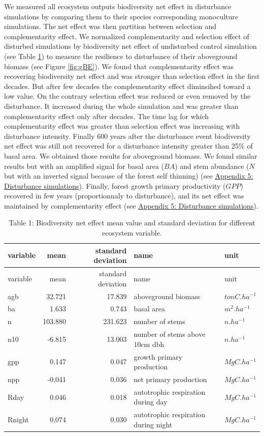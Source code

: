 \documentclass[12pt,]{article}
\theoremstyle{definition}
\theoremstyle{definition}
\theoremstyle{remark}
\begin{document}
We measured all ecosystem outputs biodiversity net effect in disturbance
simulations by comparing them to their species corresponding monoculture
simulations. The net effect was then partition between selection and
complementarity effect. We normalized complementarity and selection
effect of disturbed simulations by biodiversity net effect of
undisturbed control simulation (see Table \ref{tab:tNE}) to measure the
resilience to disturbance of their aboveground biomass (see Figure
\ref{fig:gBE}). We found that complementarity effect was recovering
biodiversity net effect and was stronger than selection effect in the
first decades. But after few decades the complementarity effect
diminsihed toward a low value. On the contrary selection effect was
reduced or even removed by the disturbance. It increased during the
whole simulation and was greater than complementarity effect only after
decades. The time lag for which complementarity effect was greater than
selection effect was increasing with disturbance intensity. Finally 600
years after the disturbance event biodiversity net effect was still not
recovered for a disturbance intensity greater than 25\% of basal area.
We obtained those results for aboveground biomass. We found similar
results but with an amplified signal for basal area (\(BA\)) and stem
abundance (\(N\) but with an inverted signal because of the forest self
thinning) (see
\protect\hyperlink{appendix-5-disturbance-simulations}{Appendix 5:
Disturbance simulations}). Finally, forest growth primary productivity
(\(GPP\)) recovered in few years (proportionnaly to disturbance), and
its net effect was maintained by complementarity effect (see
\protect\hyperlink{appendix-5-disturbance-simulations}{Appendix 5:
Disturbance simulations}).

\begin{longtable}[]{@{}lrrll@{}}
\caption{\label{tab:tNE}Table 1: Biodiversity net effect mean value and
standard deviation for different ecosystem variable.}\tabularnewline
\toprule
variable & mean & standard deviation & name & unit\tabularnewline
\midrule
\endfirsthead
\toprule
variable & mean & standard deviation & name & unit\tabularnewline
\midrule
\endhead
agb & 32.721 & 17.839 & aboveground biomass &
\(tonC.ha^{-1}\)\tabularnewline
ba & 1.633 & 0.743 & basal area & \(m^2.ha^{-1}\)\tabularnewline
n & 103.880 & 231.623 & number of stems & \(n.ha^{-1}\)\tabularnewline
n10 & -6.815 & 13.003 & number of stems above 10cm dbh &
\(n.ha^{-1}\)\tabularnewline
gpp & 0.147 & 0.047 & growth primary production &
\(MgC.ha^{-1}\)\tabularnewline
npp & -0.041 & 0.036 & net primary production &
\(MgC.ha^{-1}\)\tabularnewline
Rday & 0.046 & 0.018 & autotrophic respiration during day &
\(MgC.ha^{-1}\)\tabularnewline
Rnight & 0.074 & 0.030 & autotrophic respiration during night &
\(MgC.ha^{-1}\)\tabularnewline
\bottomrule
\end{longtable}
\end{document}
